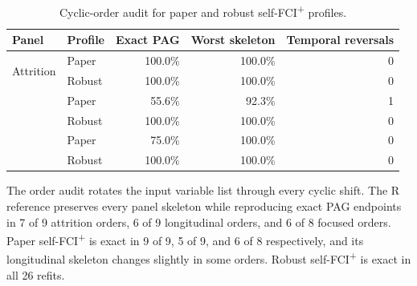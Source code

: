 \documentclass[11pt,a4paper]{article}
\newcommand{\FCIplus}{FCI\textsuperscript{+}}
\begin{document}
\begin{table}[H]
\caption{Cyclic-order audit for paper and robust self-\FCIplus{} profiles.}
\label{tab:robust-order-audit}
\centering
\begin{tabular}{llrrr}
\toprule
Panel & Profile & Exact PAG & Worst skeleton & Temporal reversals \\
\midrule
\multirow{2}{*}{Attrition} & Paper & 100.0\% & 100.0\% & 0 \\
 & Robust & 100.0\% & 100.0\% & 0 \\
\addlinespace
\multirow{2}{*}{Longitudinal} & Paper & 55.6\% & 92.3\% & 1 \\
 & Robust & 100.0\% & 100.0\% & 0 \\
\addlinespace
\multirow{2}{*}{Focused} & Paper & 75.0\% & 100.0\% & 0 \\
 & Robust & 100.0\% & 100.0\% & 0 \\
\bottomrule
\end{tabular}
\end{table}

The order audit rotates the input variable list through every cyclic shift. The
R reference preserves every panel skeleton while reproducing exact PAG endpoints
in 7 of 9 attrition orders, 6 of 9 longitudinal orders, and 6 of 8 focused
orders. Paper self-\FCIplus{} is exact in 9 of 9, 5 of 9, and 6 of 8
respectively, and its longitudinal skeleton changes slightly in some orders.
Robust self-\FCIplus{} is exact in all 26 refits.
\end{document}
